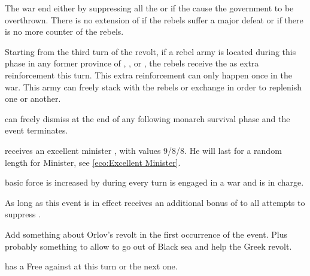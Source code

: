 \phpaix
\aparag The war end either by suppressing all the \REVOLT or if the \REVOLT
cause the government to be overthrown.
\aparag There is no extension of \REVOLT if the rebels suffer a major defeat
or if there is no more \ARMY counter of the rebels.


\phadm
\aparag Starting from the third turn of the revolt, if a rebel army is located
during this phase in any former province of \payskazan, \paysastrakhan, or
\payssteppes, the rebels receive the \paysSiberie \ARMY\faceplus as extra
reinforcement this turn.
\bparag This extra reinforcement can only happen once in the war.
\bparag This army can freely stack with the rebels or exchange \LD in order to
replenish one or another.





\aparag \RUS can freely dismiss \ministrePotemkine at the end of any following
monarch survival phase and the event terminates.

\phevnt
\aparag \RUS receives an excellent minister \ministrePotemkine, with values
9/8/8.  He will last for a random length for Minister, see \ref{eco:Excellent
  Minister}.

\phadm
\aparag \RUS basic force is increased by \FLEET\facemoins during every turn
\RUS is engaged in a war and \ministrePotemkine is in charge.

\phmil
\aparag As long as this event is in effect \RUS receives an additional bonus
of  to all attempts to suppress \REVOLT .



\begin{todo}
  Add something about Orlov's revolt in the first occurrence of the
  event. Plus probably something to allow \RUS to go out of Black sea and help
  the Greek revolt.
\end{todo}

\phevnt
\aparag \RUS has a Free \CB against \TUR at this turn or the next one.



